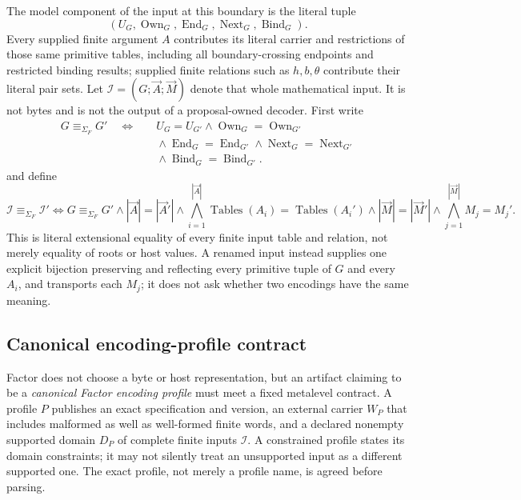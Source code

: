 \documentclass[11pt,twoside]{article}
\begin{document}
The model component of the input at this boundary is the literal tuple
\[
(U_G,\operatorname{Own}_G,\operatorname{End}_G,
 \operatorname{Next}_G,\operatorname{Bind}_G).
\]
Every supplied finite argument
\(A\) contributes its literal carrier and restrictions of those same primitive
tables, including all boundary-crossing endpoints and restricted binding results;
supplied finite relations such as \(h,b,\theta\) contribute their literal pair
sets.  Let \(\mathcal I=(G;\vec A;\vec M)\) denote that whole mathematical input.
It is not bytes and is not the output of a proposal-owned decoder.  First write
\[
\begin{aligned}
 G\equiv_{\Sigma_F}G'\quad\Longleftrightarrow\quad{}
 &U_G=U_{G'}
 \land\operatorname{Own}_G=\operatorname{Own}_{G'}\\
 &{}\land\operatorname{End}_G=\operatorname{End}_{G'}
 \land\operatorname{Next}_G=\operatorname{Next}_{G'}\\
 &{}\land\operatorname{Bind}_G=\operatorname{Bind}_{G'}.
\end{aligned}
\]
and define
\[
 \mathcal I\equiv_{\Sigma_F}\mathcal I'
 \Longleftrightarrow
 G\equiv_{\Sigma_F}G'
 \land|\vec A|=|\vec A'|
 \land\bigwedge_{i=1}^{|\vec A|}
       \operatorname{Tables}(A_i)=\operatorname{Tables}(A_i')
 \land|\vec M|=|\vec M'|
 \land\bigwedge_{j=1}^{|\vec M|}M_j=M_j'.
\]
This is literal extensional equality of every finite input table and relation, not
merely equality of roots or host values.  A renamed input instead supplies one
explicit bijection preserving and reflecting every primitive tuple of \(G\) and
every \(A_i\), and transports each \(M_j\); it does not ask whether two encodings
have the same meaning.

\subsection{Canonical encoding-profile contract}

Factor does not choose a byte or host representation, but an artifact claiming to
be a \emph{canonical Factor encoding profile} must meet a fixed metalevel
contract.  A profile \(P\) publishes an exact specification and version, an
external carrier \(W_P\) that includes malformed as well as well-formed finite
words, and a declared nonempty supported domain
\(D_P\) of complete finite inputs \(\mathcal I\).  A constrained profile states
its domain constraints; it may not silently treat an unsupported input as a
different supported one.  The exact profile, not merely a profile name, is agreed
before parsing.
\end{document}
